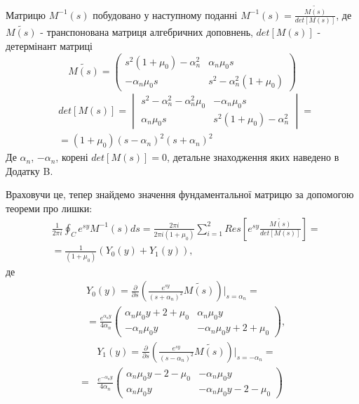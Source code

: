 Матрицю $M^{-1}(s)$ побудовано у наступному поданні $M^{-1}(s) = \frac{\widetilde{M(s)}}{det[M(s)]}$, де $\widetilde{M(s)}$ - транспонована матриця алгебричних доповнень,
$det[M(s)]$ - детермінант матриці
\begin{equation}
    \widetilde{M(s)} = \begin{pmatrix}
        s^2 (1 + \mu_0) -\alpha_n^2 & \alpha_n \mu_0 s \\
        -\alpha_n \mu_0 s & s^2 -\alpha_n^2(1 + \mu_0)
     \end{pmatrix}
\end{equation}
\begin{align}
    &det[M(s)] = \begin{vmatrix}
        s^2 - \alpha_n^2 - \alpha_n^2\mu_0 & -\alpha_n \mu_0 s \\
        \alpha_n \mu_0 s & s^2 (1 + \mu_0) -\alpha_n^2
     \end{vmatrix} = \nonumber \\
    &=(1+\mu_0)(s - \alpha_n)^2(s + \alpha_n)^2
\end{align}
Де $\alpha_n$, $-\alpha_n$, корені $det[M(s)]=0$, детальне знаходження яких наведено в Додатку B.

Враховучи це, тепер знайдемо значення фундаментальної матрицю за допомогою теореми про лишки:
\begin{align*}
    &\frac{1}{2\pi i} \oint_C e^{sy} M^{-1}(s)ds = \frac{2 \pi i}{2 \pi i (1 + \mu_0)} \sum_{i=1}^{2} Res\left[ e^{sy} \frac{\widetilde{M(s)}}{det[M(s)]} \right] = \\
    & = \frac{1}{(1 + \mu_0)} \left(Y_0(y) + Y_1(y) \right),
\end{align*}
де
\begin{align}\label{fund_mat_0_static_1}
    &Y_0(y) =  \frac{\partial}{\partial s} \left( \frac{e^{sy}}{(s+\alpha_n)^2} \widetilde{M(s)} \right) \Big|_{s=\alpha_n} = \nonumber \\
    &=\frac{e^{\alpha_n y}}{4\alpha_n} \begin{pmatrix}
    \alpha_n \mu_0 y + 2 + \mu_0 & \alpha_n \mu_0 y \\
    -\alpha_n \mu_0 y & -\alpha_n \mu_0 y + 2 + \mu_0
    \end{pmatrix},
\end{align}
\begin{align}\label{fund_mat_1_static_1}
    &Y_1(y) = \frac{\partial}{\partial s} \left(\frac{e^{sy}}{(s-\alpha_n)^2} \widetilde{M(s)} \right) \Big|_{s=-\alpha_n} = \nonumber \\
    =&\frac{e^{-\alpha_n y}}{4\alpha_n} \begin{pmatrix}
    \alpha_n \mu_0 y - 2 - \mu_0 & -\alpha_n \mu_0 y \\
    \alpha_n \mu_0 y & -\alpha_n \mu_0 y - 2 - \mu_0
    \end{pmatrix}
\end{align}

